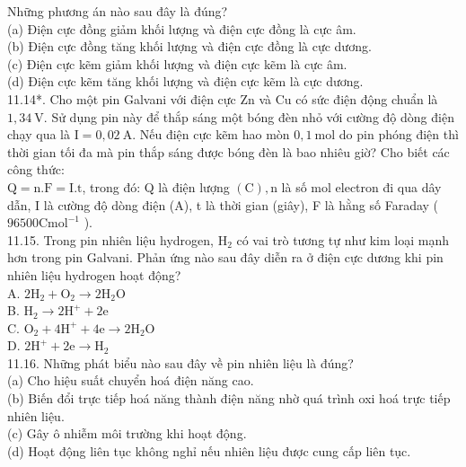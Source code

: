 \documentclass[10pt]{article}
\begin{document}
Những phương án nào sau đây là đúng?\\
(a) Điện cực đồng giảm khối lượng và điện cực đồng là cực âm.\\
(b) Điện cực đồng tăng khối lượng và điện cực đồng là cực dương.\\
(c) Điện cực kẽm giảm khối lượng và điện cực kẽm là cực âm.\\
(d) Điện cực kẽm tăng khối lượng và điện cực kẽm là cực dương.\\
11.14*. Cho một pin Galvani với điện cực Zn và Cu có sức điện động chuẩn là $1,34 \mathrm{~V}$. Sử dụng pin này để thắp sáng một bóng đèn nhỏ với cường độ dòng điện chạy qua là $\mathrm{I}=0,02 \mathrm{~A}$. Nếu điện cực kẽm hao mòn $0,1 \mathrm{~mol}$ do pin phóng điện thì thời gian tối đa mà pin thắp sáng được bóng đèn là bao nhiêu giờ? Cho biết các công thức:\\
$\mathrm{Q}=\mathrm{n} . \mathrm{F}=\mathrm{I} . \mathrm{t}$, trong đó: Q là điện lượng $(\mathrm{C}), \mathrm{n}$ là số mol electron đi qua dây dẫn, I là cường độ dòng điện (A), t là thời gian (giây), F là hằng số Faraday ( $96500 \mathrm{C} \mathrm{mol}^{-1}$ ).\\
11.15. Trong pin nhiên liệu hydrogen, $\mathrm{H}_{2}$ có vai trò tương tự như kim loại mạnh hơn trong pin Galvani. Phản ứng nào sau đây diễn ra ở điện cực dương khi pin nhiên liệu hydrogen hoạt động?\\
A. $2 \mathrm{H}_{2}+\mathrm{O}_{2} \rightarrow 2 \mathrm{H}_{2} \mathrm{O}$\\
B. $\mathrm{H}_{2} \rightarrow 2 \mathrm{H}^{+}+2 \mathrm{e}$\\
C. $\mathrm{O}_{2}+4 \mathrm{H}^{+}+4 \mathrm{e} \rightarrow 2 \mathrm{H}_{2} \mathrm{O}$\\
D. $2 \mathrm{H}^{+}+2 \mathrm{e} \rightarrow \mathrm{H}_{2}$\\
11.16. Những phát biểu nào sau đây về pin nhiên liệu là đúng?\\
(a) Cho hiệu suất chuyển hoá điện năng cao.\\
(b) Biến đổi trực tiếp hoá năng thành điện năng nhờ quá trình oxi hoá trực tiếp nhiên liệu.\\
(c) Gây ô nhiễm môi trường khi hoạt động.\\
(d) Hoạt động liên tục không nghỉ nếu nhiên liệu được cung cấp liên tục.
\end{document}
